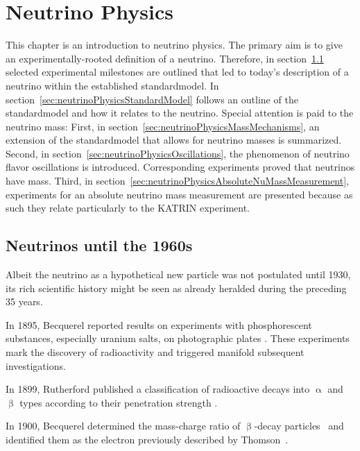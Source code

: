 \def\currentRootFolder{chapter/neutrinoPhysics}
\def\currentFigureFolder{\currentRootFolder/fig}

\chapter{Neutrino Physics}
\label{sec:neutrinoPhysics}
This chapter is an introduction to neutrino physics. The primary aim is to give an experimentally-rooted definition of a neutrino. Therefore, in section~\ref{sec:neutrinoPhysicsHistory} selected experimental milestones are outlined that led to today's description of a neutrino within the established \gls{standardmodel}. In section~\ref{sec:neutrinoPhysicsStandardModel} follows an outline of the \gls{standardmodel} and how it relates to the neutrino. Special attention is paid to the neutrino mass: First, in section~\ref{sec:neutrinoPhysicsMassMechanisms}, an extension of the \gls{standardmodel} that allows for neutrino masses is summarized. Second, in section~\ref{sec:neutrinoPhysicsOscillations}, the phenomenon of neutrino flavor oscillations is introduced. Corresponding experiments proved that neutrinos have mass. Third, in section~\ref{sec:neutrinoPhysicsAbsoluteNuMassMeasurement}, experiments for an absolute neutrino mass measurement are presented because as such they relate particularly to the KATRIN experiment.

\section{Neutrinos until the 1960s}
\label{sec:neutrinoPhysicsHistory}
Albeit the neutrino as a hypothetical new particle was not postulated until 1930, its rich scientific history might be seen as already heralded during the preceding 35 years. 

In 1895, Becquerel reported results on experiments with phosphorescent substances, especially uranium salts, on photographic plates \cite{Becquerel:1}. These experiments mark the discovery of radioactivity and triggered manifold subsequent investigations. 

In 1899, Rutherford published a classification of radioactive decays into $\upalpha$ and $\upbeta$ types according to their penetration strength \cite{Rutherford:1}. 

In 1900, Becquerel determined the mass-charge ratio of $\upbeta$-decay particles~\cite{Becquerel:2} and identified them as the electron previously described by Thomson~\cite{Thomson:1}. 

